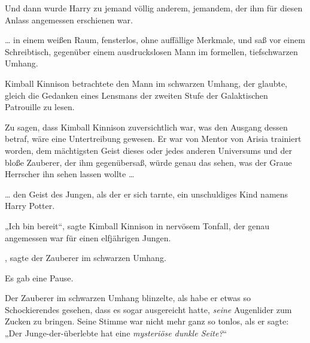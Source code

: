 Und dann wurde Harry zu jemand völlig anderem, jemandem, der ihm für diesen Anlass angemessen erschienen war.

… in einem weißen Raum, fensterlos, ohne auffällige Merkmale, und saß vor einem Schreibtisch, gegenüber einem ausdruckslosen Mann im formellen, tiefschwarzen Umhang.

Kimball Kinnison betrachtete den Mann im schwarzen Umhang, der glaubte, gleich die Gedanken eines Lensmans der zweiten Stufe der Galaktischen Patrouille zu lesen.

Zu sagen, dass Kimball Kinnison zuversichtlich war, was den Ausgang dessen betraf, wäre eine Untertreibung gewesen. Er war von Mentor von Arisia trainiert worden, dem mächtigsten Geist dieses oder jedes anderen Universums und der bloße Zauberer, der ihm gegenübersaß, würde genau das sehen, was der Graue Herrscher ihn sehen lassen wollte …

… den Geist des Jungen, als der er sich tarnte, ein unschuldiges Kind namens Harry Potter.

„Ich bin bereit“, sagte Kimball Kinnison in nervösem Tonfall, der genau angemessen war für einen elfjährigen Jungen.

, sagte der Zauberer im schwarzen Umhang.

Es gab eine Pause.

Der Zauberer im schwarzen Umhang blinzelte, als habe er etwas so Schockierendes gesehen, dass es sogar ausgereicht hatte, \emph{seine} Augenlider zum Zucken zu bringen. Seine Stimme war nicht mehr ganz so tonlos, als er sagte:
„Der Junge-der-überlebte hat eine \emph{mysteriöse dunkle Seite?}“

